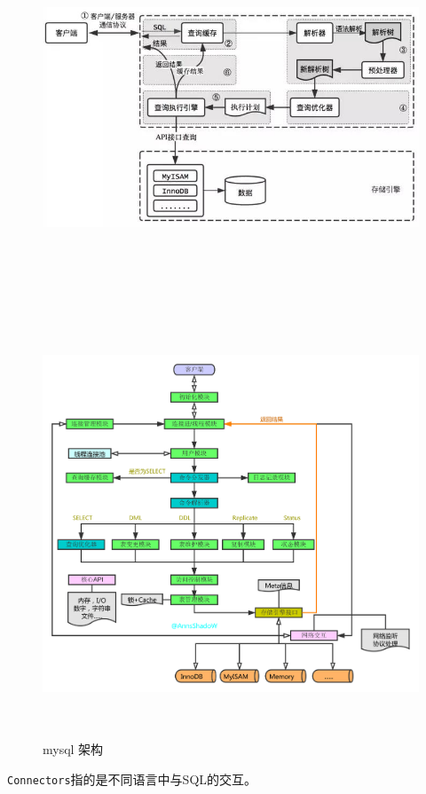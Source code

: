 \documentclass[UTF8,a4paper,12pt]{ctexbook}
\begin{document}
			
			\begin{figure}[H]
				\centering
				\includegraphics[width=16cm,height= 12cm]{mysqlArch2}
				\includegraphics[width=17cm,height= 12cm]{mysqlArch}
				\caption{mysql 架构}
			\end{figure} 	
			
			
			\verb|Connectors|指的是不同语言中与SQL的交互。
			
\end{document}
